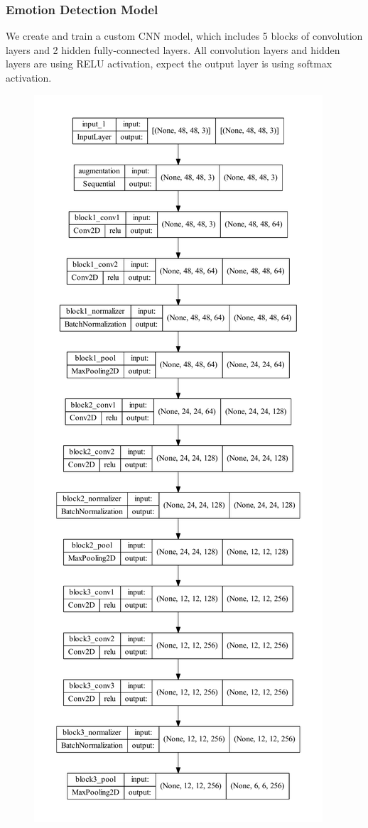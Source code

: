 \documentclass[11pt,a4paper]{article}
\begin{document}
    \subsubsection{Emotion Detection Model}
    We create and train a custom CNN model, which includes 5 blocks of convolution layers and 2 hidden fully-connected layers. All convolution layers and hidden layers  are using RELU activation, expect the output layer is using softmax activation.
    \begin{figure}[H]
        \centering
        \begin{minipage}[b]{.4\textwidth}
            \centering
            \includegraphics[height = 0.9\textheight]{written_report/pictures/model_1.pdf}

\end{minipage}
\end{figure}
\end{document}
